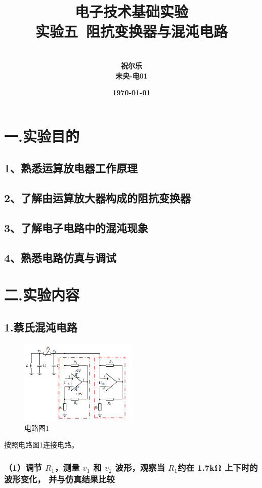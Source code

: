 \documentclass[UTF8]{ctexart}
\title{{电子技术基础实验} \\ \textbf{实验五\ 阻抗变换器与混沌电路}}
\author{\\\textbf{祝尔乐}
        \\\textbf{未央-电01}
        }
\date{\textbf{\today}}
\begin{document}
\maketitle

\section*{一.实验目的}

\subsection*{1、熟悉运算放电器工作原理}
\subsection*{2、了解由运算放大器构成的阻抗变换器}
\subsection*{3、了解电子电路中的混沌现象}
\subsection*{4、熟悉电路仿真与调试}

\section*{二.实验内容}

\subsection*{1.蔡氏混沌电路}

\begin{figure}[H]
        \centering
        \includegraphics*[width = 0.5\textwidth]{1-电路图.png}
        \caption{电路图1}
\end{figure}

按照电路图1连接电路。

\subsubsection*{（1）调节 $R_1$，测量 $v_1$ 和 $v_2$ 波形，观察当 $R_1$约在 1.7kΩ 上下时的波形变化，
并与仿真结果比较}
\end{document}
